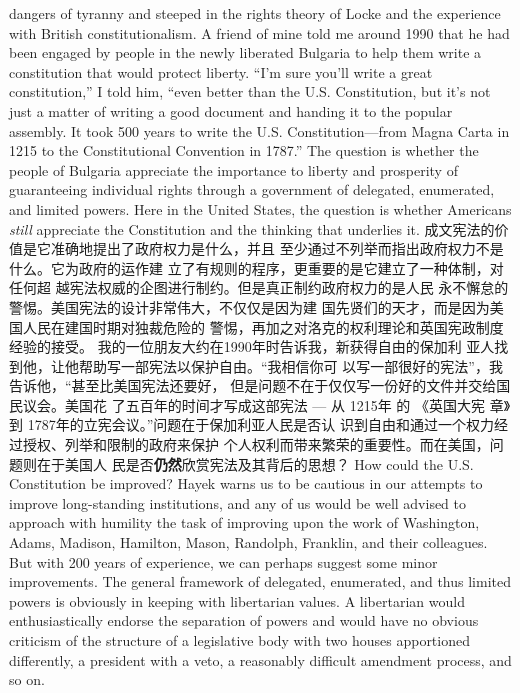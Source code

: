 \begin{paracol}{2}
dangers of tyranny and steeped in the rights theory of Locke
and the experience with British constitutionalism. A friend of
mine told me around 1990 that he had been engaged by people
in the newly liberated Bulgaria to help them write a constitution that would protect liberty. ``I'm sure you'll write a great
constitution,'' I told him, ``even better than the U.S. Constitution, but it's not just a matter of writing a good document and
handing it to the popular assembly. It took 500 years to write
the U.S. Constitution---from Magna Carta in 1215 to the Constitutional Convention in 1787.'' The question is whether the
people of Bulgaria appreciate the importance to liberty and
prosperity of guaranteeing individual rights through a government of delegated, enumerated, and limited powers. Here in
the United States, the question is whether Americans \textit{still} appreciate the Constitution and the thinking that underlies it.
\switchcolumn
成文宪法的价值是它准确地提出了政府权力是什么，并且
至少通过不列举而指出政府权力不是什么。它为政府的运作建
立了有规则的程序，更重要的是它建立了一种体制，对任何超
越宪法权威的企图进行制约。但是真正制约政府权力的是人民
永不懈怠的警惕。美国宪法的设计非常伟大，不仅仅是因为建
国先贤们的天才，而是因为美国人民在建国时期对独裁危险的
警惕，再加之对洛克的权利理论和英国宪政制度经验的接受。
我的一位朋友大约在1990年时告诉我，新获得自由的保加利
亚人找到他，让他帮助写一部宪法以保护自由。“我相信你可
以写一部很好的宪法”，我告诉他，“甚至比美国宪法还要好，
但是问题不在于仅仅写一份好的文件并交给国民议会。美国花
了五百年的时间才写成这部宪法 --- 从 1215年 的 《英国大宪
章》到 1787年的立宪会议。”问题在于保加利亚人民是否认
识到自由和通过一个权力经过授权、列举和限制的政府来保护
个人权利而带来繁荣的重要性。而在美国，问题则在于美国人
民是否\textbf{仍然}欣赏宪法及其背后的思想？
\switchcolumn*
How could the U.S. Constitution be improved? Hayek warns
us to be cautious in our attempts to improve long-standing institutions, and any of us would be well advised to approach with
humility the task of improving upon the work of Washington,
Adams, Madison, Hamilton, Mason, Randolph, Franklin, and
their colleagues. But with 200 years of experience, we can perhaps suggest some minor improvements. The general framework of delegated, enumerated, and thus limited powers is
obviously in keeping with libertarian values. A libertarian would enthusiastically endorse the separation of powers and
would have no obvious criticism of the structure of a legislative
body with two houses apportioned differently, a president with
a veto, a reasonably difficult amendment process, and so on.

\end{paracol}
